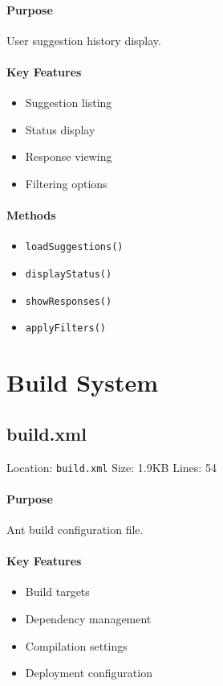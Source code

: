 \documentclass[12pt,a4paper]{article}
\begin{document}
\paragraph{Purpose}
User suggestion history display.

\paragraph{Key Features}
\begin{itemize}
    \item Suggestion listing
    \item Status display
    \item Response viewing
    \item Filtering options
\end{itemize}

\paragraph{Methods}
\begin{itemize}
    \item \texttt{loadSuggestions()}
    \item \texttt{displayStatus()}
    \item \texttt{showResponses()}
    \item \texttt{applyFilters()}
\end{itemize}

\section{Build System}
\subsection{build.xml}
Location: \texttt{build.xml}
Size: 1.9KB
Lines: 54

\paragraph{Purpose}
Ant build configuration file.

\paragraph{Key Features}
\begin{itemize}
    \item Build targets
    \item Dependency management
    \item Compilation settings
    \item Deployment configuration
\end{itemize}
\end{document}

